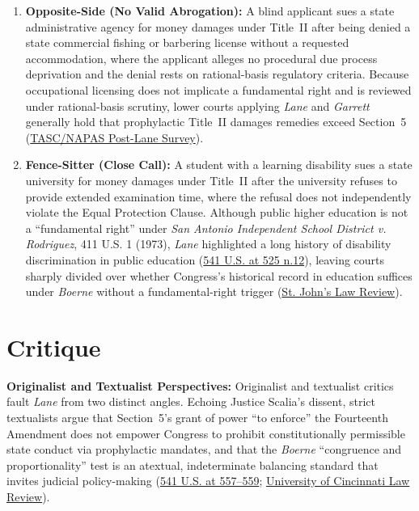 \documentclass[12pt]{article}
\begin{document}
\begin{enumerate}
    \item \textbf{Opposite-Side (No Valid Abrogation):} A blind applicant sues a state administrative agency for money damages under Title~II after being denied a state commercial fishing or barbering license without a requested accommodation, where the applicant alleges no procedural due process deprivation and the denial rests on rational-basis regulatory criteria. Because occupational licensing does not implicate a fundamental right and is reviewed under rational-basis scrutiny, lower courts applying \textit{Lane} and \textit{Garrett} generally hold that prophylactic Title~II damages remedies exceed Section~5 (\href{https://www.tascnow.com/wp-content/uploads/2019/03/TASC_0412_ada_lane.pdf}{TASC/NAPAS Post-Lane Survey}).

    \item \textbf{Fence-Sitter (Close Call):} A student with a learning disability sues a state university for money damages under Title~II after the university refuses to provide extended examination time, where the refusal does not independently violate the Equal Protection Clause. Although public higher education is not a ``fundamental right'' under \textit{San Antonio Independent School District v. Rodriguez}, 411 U.S. 1 (1973), \textit{Lane} highlighted a long history of disability discrimination in public education (\href{https://www.law.cornell.edu/supremecourt/text/541/509}{541 U.S. at 525 n.12}), leaving courts sharply divided over whether Congress's historical record in education suffices under \textit{Boerne} without a fundamental-right trigger (\href{https://scholarship.law.stjohns.edu/cgi/viewcontent.cgi?article=1203&context=lawreview}{St. John's Law Review}).
\end{enumerate}

\section{Critique}
\textbf{Originalist and Textualist Perspectives:} Originalist and textualist critics fault \textit{Lane} from two distinct angles. Echoing Justice Scalia's dissent, strict textualists argue that Section~5's grant of power ``to enforce'' the Fourteenth Amendment does not empower Congress to prohibit constitutionally permissible state conduct via prophylactic mandates, and that the \textit{Boerne} ``congruence and proportionality'' test is an atextual, indeterminate balancing standard that invites judicial policy-making (\href{https://www.law.cornell.edu/supremecourt/text/541/509}{541 U.S. at 557--559}; \href{https://uclawreview.org/2025/05/05/keeping-sovereign-immunity-kind-of-simple-why-courts-should-apply-the-united-states-v-georgia-test-strictly/}{University of Cincinnati Law Review}). 
\end{document}
